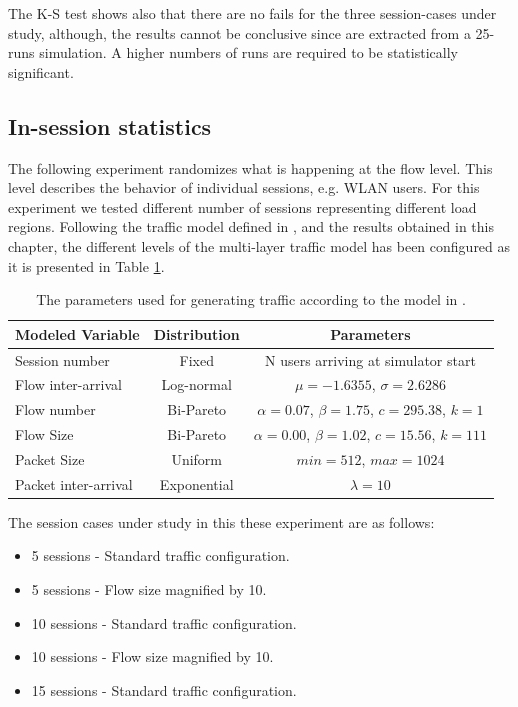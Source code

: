 The \acs{K-S} test shows also that there are no fails for the three session-cases under study, although, the results cannot be conclusive since are extracted from a 25-runs simulation. A higher numbers of runs are required to be statistically significant.

\subsection{In-session statistics} \label{subsec:globalview_insession}
The following experiment randomizes what is happening at the flow level. This level describes the behavior of individual sessions, e.g. \acs{WLAN} users. For this experiment we tested different number of sessions representing different load regions. Following the traffic model defined in \cite{Campus-WLAN}, and the results obtained in this chapter, the different levels of the multi-layer traffic model has been configured as it is presented in Table \ref{tab:sim_traffic_model}.

\begin{table}[h!]
	\begin{center}
		\begin{tabular}{ l | c | c }
			Modeled Variable & Distribution & Parameters \\ \hline
			Session number	& Fixed & N users arriving at simulator start \\
			Flow inter-arrival & Log-normal & $\mu = -1.6355$, $\sigma = 2.6286$ \\
			Flow number & Bi-Pareto & $\alpha = 0.07$, $\beta = 1.75$, $c = 295.38$, $k = 1$ \\
			Flow Size & Bi-Pareto & $\alpha = 0.00$, $\beta = 1.02$, $c = 15.56$, $k = 111$ \\
			Packet Size & Uniform & $min = 512$, $max = 1024$ \\
			Packet inter-arrival & Exponential & $\lambda = 10$ \\
		\end{tabular}
		\caption{The parameters used for generating traffic according to the model in \cite{Campus-WLAN}.}
		\label{tab:sim_traffic_model}
	\end{center}
\end{table}

The session cases under study in this these experiment are as follows:

\begin{itemize}
	\item 5 sessions - Standard traffic configuration.
	\item 5 sessions - Flow size magnified by 10.
	\item 10 sessions - Standard traffic configuration.
	\item 10 sessions - Flow size magnified by 10.
	\item 15 sessions - Standard traffic configuration. 
\end{itemize}

